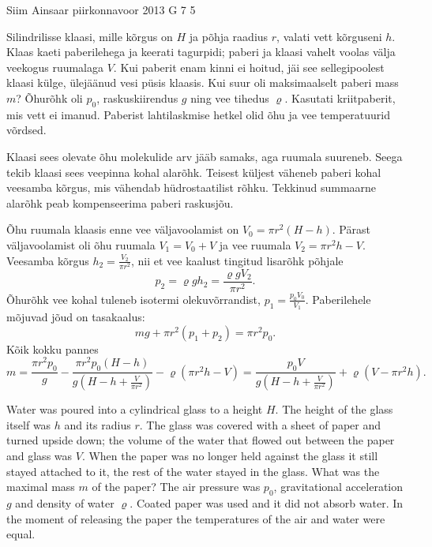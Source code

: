 {Siim Ainsaar} %
{piirkonnavoor} %
{2013} %
{G 7} %
{5} %
{
\ifStatement
Silindrilisse klaasi, mille kõrgus on $H$ ja põhja raadius $r$, valati
vett kõrguseni $h$. Klaas kaeti paberilehega ja keerati
tagurpidi; paberi ja
klaasi vahelt voolas välja veekogus ruumalaga $V$. Kui paberit enam kinni ei
hoitud, jäi see sellegipoolest klaasi külge, ülejäänud vesi püsis klaasis.
Kui suur oli maksimaalselt paberi mass $m$? Õhurõhk oli $p_0$,
raskuskiirendus $g$ ning vee tihedus $\varrho$.
Kasutati kriitpaberit, mis vett ei imanud. Paberist lahtilaskmise hetkel olid 
õhu ja vee temperatuurid võrdsed.
\fi


\ifHint
Klaasi sees olevate õhu molekulide arv jääb samaks, aga ruumala suureneb. Seega tekib klaasi sees veepinna kohal alarõhk. Teisest küljest väheneb paberi kohal veesamba kõrgus, mis vähendab hüdrostaatilist rõhku. Tekkinud summaarne alarõhk peab kompenseerima paberi raskusjõu.
\fi


\ifSolution
Õhu ruumala klaasis enne vee väljavoolamist on 
$V_0 = \pi r^2 (H-h)$.
Pärast väljavoolamist oli õhu ruumala
$V_1 = V_0 + V$
ja vee ruumala
$V_2 = \pi r^2 h - V$.
Veesamba kõrgus
$h_2 = \frac{ V_2 }{ \pi r^2 }$,
nii et vee kaalust tingitud lisarõhk põhjale
\[
p_2 = \varrho g h_2 = \frac{ \varrho g V_2 }{ \pi r^2 }.
\]
Õhurõhk vee kohal tuleneb isotermi olekuvõrrandist,
$p_1 = \frac{p_0 V_0}{V_1}$.
Paberilehele mõjuvad jõud on tasakaalus:
\[
mg + \pi r^2 (p_1 + p_2) = \pi r^2 p_0.
\]
Kõik kokku pannes
\[ m =
\frac{ \pi r^2 p_0 }{ g } -
\frac{ \pi r^2 p_0 (H-h) }{ g \left( H - h + \frac{V}{\pi r^2} \right) } -
\varrho \left( \pi r^2 h - V \right)
=
\frac{ p_0 V }{ g \left( H - h + \frac{V}{ \pi r^2 } \right) } + \varrho \left( V - \pi r^2 h \right).
\]
\fi


\ifEngStatement
Water was poured into a cylindrical glass to a height $H$. The height of the glass itself was $h$ and its radius $r$. The glass was covered with a sheet of paper and turned upside down; the volume of the water that flowed out between the paper and glass was $V$. When the paper was no longer held against the glass it still stayed attached to it, the rest of the water stayed in the glass. What was the maximal mass $m$ of the paper? The air pressure was $p_0$, gravitational acceleration $g$ and density of water $\varrho$. Coated paper was used and it did not absorb water. In the moment of releasing the paper the temperatures of the air and water were equal.
\fi


}

